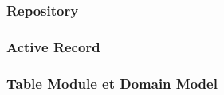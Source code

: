 \begin{frame}
    \frametitle{Repository}
\end{frame}

\begin{frame}
    \frametitle{Active Record}
\end{frame}

\begin{frame}
    \frametitle{Table Module et Domain Model}
\end{frame}
